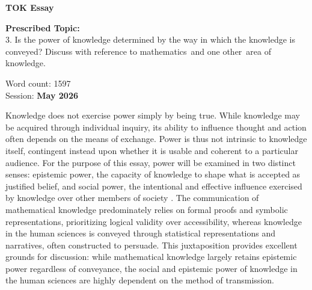 \documentclass[12pt]{article}
\begin{document}
	
	
	\doublespacing
	
	\begin{titlepage}
		\centering
		
		\textbf{TOK Essay}
		
		\vspace*{4cm}
		
		\textbf{Prescribed Topic:}\\
		3. Is the power of knowledge determined by the way in which the knowledge is conveyed? Discuss with reference to mathematics and one other area of knowledge.
		
		\vspace{3cm}
		
		Word count: 1597\\
		
		\vspace{2cm}
		Session: \textbf{May 2026}
		
		\vfill
	\end{titlepage}
		

Knowledge does not exercise power simply by being true. While knowledge may be acquired through individual inquiry, its ability to influence thought and action often depends on the means of exchange. Power is thus not intrinsic to knowledge itself, contingent instead upon whether it is usable and coherent to a particular audience. For the purpose of this essay, power will be examined in two distinct senses: epistemic power, the capacity of knowledge to shape what is accepted as justified belief, and social power, the intentional and effective influence exercised by knowledge over other members of society \parencites{Archer_Cawston_Matheson_Geuskens_2020, 141269df-8a9c-3d34-add1-77d740470f50}. The communication of mathematical knowledge predominately relies on formal proofs and symbolic representations, prioritizing logical validity over accessibility, whereas knowledge in the human sciences is conveyed through statistical representations and narratives, often constructed to persuade. This juxtaposition provides excellent grounds for discussion: while mathematical knowledge largely retains epistemic power regardless of conveyance, the social and epistemic power of knowledge in the human sciences are highly dependent on the method of transmission.
\end{document}
